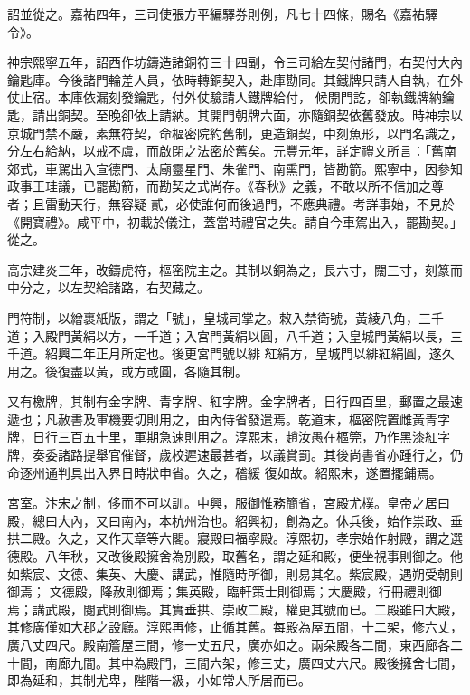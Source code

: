 \begin{pinyinscope}
 詔並從之。嘉祐四年，三司使張方平編驛券則例，凡七十四條，賜名《嘉祐驛令》。



 神宗熙寧五年，詔西作坊鑄造諸銅符三十四副，令三司給左契付諸門，右契付大內鑰匙庫。今後諸門輪差人員，依時轉銅契入，赴庫勘同。其鐵牌只請人自執，在外仗止宿。本庫依漏刻發鑰匙，付外仗驗請人鐵牌給付，
 候開門訖，卻執鐵牌納鑰匙，請出銅契。至晚卻依上請納。其開門朝牌六面，亦隨銅契依舊發放。時神宗以京城門禁不嚴，素無符契，命樞密院約舊制，更造銅契，中刻魚形，以門名識之，分左右給納，以戒不虞，而啟閉之法密於舊矣。元豐元年，詳定禮文所言：「舊南郊式，車駕出入宣德門、太廟靈星門、朱雀門、南熏門，皆勘箭。熙寧中，因參知政事王珪議，已罷勘箭，而勘契之式尚存。《春秋》之義，不敢以所不信加之尊者；且雷動天行，無容疑
 貳，必使誰何而後過門，不應典禮。考詳事始，不見於《開寶禮》。咸平中，初載於儀注，蓋當時禮官之失。請自今車駕出入，罷勘契。」從之。



 高宗建炎三年，改鑄虎符，樞密院主之。其制以銅為之，長六寸，闊三寸，刻篆而中分之，以左契給諸路，右契藏之。



 門符制，以繒裹紙版，謂之「號」，皇城司掌之。敕入禁衛號，黃綾八角，三千道；入殿門黃絹以方，一千道；入宮門黃絹以圓，八千道；入皇城門黃絹以長，三千道。紹興二年正月所定也。後更宮門號以緋
 紅絹方，皇城門以緋紅絹圓，遂久用之。後復盡以黃，或方或圓，各隨其制。



 又有檄牌，其制有金字牌、青字牌、紅字牌。金字牌者，日行四百里，郵置之最速遞也；凡赦書及軍機要切則用之，由內侍省發遣焉。乾道末，樞密院置雌黃青字牌，日行三百五十里，軍期急速則用之。淳熙末，趙汝愚在樞筦，乃作黑漆紅字牌，奏委諸路提舉官催督，歲校遲速最甚者，以議賞罰。其後尚書省亦踵行之，仍命逐州通判具出入界日時狀申省。久之，稽緩
 復如故。紹熙末，遂置擺鋪焉。



 宮室。汴宋之制，侈而不可以訓。中興，服御惟務簡省，宮殿尤樸。皇帝之居曰殿，總曰大內，又曰南內，本杭州治也。紹興初，創為之。休兵後，始作祟政、垂拱二殿。久之，又作天章等六閣。寢殿曰福寧殿。淳熙初，孝宗始作射殿，謂之選德殿。八年秋，又改後殿擁舍為別殿，取舊名，謂之延和殿，便坐視事則御之。他如紫宸、文德、集英、大慶、講武，惟隨時所御，則易其名。紫宸殿，遇朔受朝則御焉；
 文德殿，降赦則御焉；集英殿，臨軒策士則御焉；大慶殿，行冊禮則御焉；講武殿，閱武則御焉。其實垂拱、崇政二殿，權更其號而已。二殿雖曰大殿，其修廣僅如大郡之設廳。淳熙再修，止循其舊。每殿為屋五間，十二架，修六丈，廣八丈四尺。殿南簷屋三間，修一丈五尺，廣亦如之。兩朵殿各二間，東西廊各二十間，南廊九間。其中為殿門，三間六架，修三丈，廣四丈六尺。殿後擁舍七間，即為延和，其制尤卑，陛階一級，小如常人所居而已。




\end{pinyinscope}
